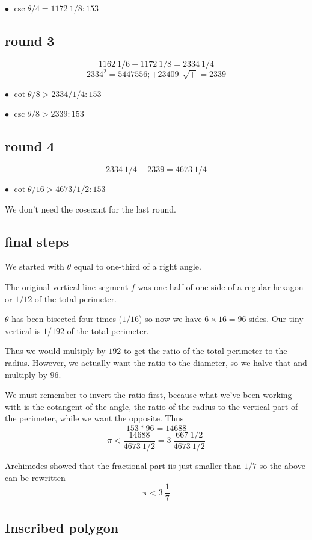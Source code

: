 \documentclass[11pt, oneside]{article}
\begin{document}
$\bullet$  $\csc \theta/4 =1172 \ 1/8:153$

\subsection*{round 3}
\[ 1162 \ 1/6 + 1172 \ 1/8 = 2334 \ 1/4 \]
\[ 2334^2 = 5447556;  + 23409 \ \ \sqrt{+} = 2339 \]

$\bullet$  $\cot \theta/8 > 2334 / 1/4:153$ 

$\bullet$  $\csc \theta/8 > 2339:153$

\subsection*{round 4}
\[ 2334 \ 1/4 + 2339 = 4673 \ 1/4 \]

$\bullet$  $\cot \theta/16 > 4673 / 1/2:153$ 

We don't need the cosecant for the last round. 

\subsection*{final steps}
We started with $\theta$ equal to one-third of a right angle.  

The original vertical line segment $f$ was one-half of one side of a regular hexagon or $1/12$ of the total perimeter.

$\theta$ has been bisected four times ($1/16$) so now we have $6 \times 16 = 96$ sides.  Our tiny vertical is $1/192$ of the total perimeter.

Thus we would multiply by $192$ to get the ratio of the total perimeter to the radius.  However, we actually want the ratio to the diameter, so we halve that and multiply by $96$.

We must remember to invert the ratio first, because what we've been working with is the cotangent of the angle, the ratio of the radius to the vertical part of the perimeter, while we want the opposite.  Thus
\[ 153 * 96 = 14688 \]
\[ \pi < \frac{14688}{4673 \ 1/2} = 3 \ \frac{667 \ 1/2}{4673 \ 1/2} \]

Archimedes showed that the fractional part iis just smaller than $1/7$ so the above can be rewritten
\[ \pi < 3 \ \frac{1} {7} \]

\subsection*{Inscribed polygon}
\end{document}
